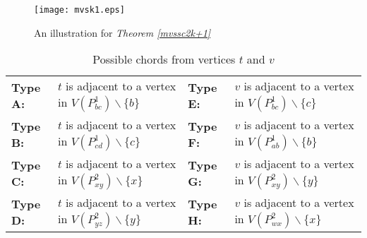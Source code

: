 \documentclass[runningheads]{llncs}
\begin{document}
\begin{figure}[h]
\vspace{-0.5cm}
\begin{center}
\texttt{[image: mvsk1.eps]}
\vspace{-0.5cm}
\caption{An illustration for \emph{Theorem \ref{mvssc2k+1}}}
\label{mvsk1}
\end{center}

\end{figure}

\vspace{-1.4cm}
\begin{table}[h]
\centering
\label{pre}
\caption{Possible chords from vertices $t$ and $v$}
\begin{tabular}{|l|l|l|l|} \hline
\textbf{Type A:} & $t$ is adjacent to a vertex in $V(P_{bc}^{1})\backslash \{b\}$ &
\textbf{Type E:} & $v$ is adjacent to a vertex in $V(P_{bc}^{1})\backslash \{c\}$ \\
\textbf{Type B:} & $t$ is adjacent to a vertex in $V(P_{cd}^{1})\backslash \{c\}$ &
\textbf{Type F:} & $v$ is adjacent to a vertex in $V(P_{ab}^{1})\backslash \{b\}$ \\
\textbf{Type C:} & $t$ is adjacent to a vertex in $V(P_{xy}^{2})\backslash \{x\}$ &
\textbf{Type G:} & $v$ is adjacent to a vertex in $V(P_{xy}^{2})\backslash \{y\}$ \\
\textbf{Type D:} & $t$ is adjacent to a vertex in $V(P_{yz}^{2})\backslash \{y\}$ &
\textbf{Type H:} & $v$ is adjacent to a vertex in $V(P_{wx}^{2})\backslash \{x\}$ \\ \hline
\end{tabular}
\vspace{-0.8cm}
\end{table}
\end{document}
